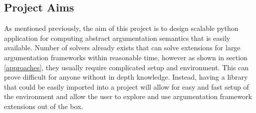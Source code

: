 \subsection{Project Aims}
As mentioned previously, the aim of this project is to design scalable python application for computing abstract argumentation semantics that is easily available. Number of solvers already exists that can solve extensions for large argumentation frameworks within reasonable time, however as shown in section \ref{approaches}, they usually require complicated setup and environment. This can prove difficult for anyone without in depth knowledge. Instead, having a library that could be easily imported into a project will allow for easy and fast setup of the environment and allow the user to explore and use argumentation framework extensions out of the box.

